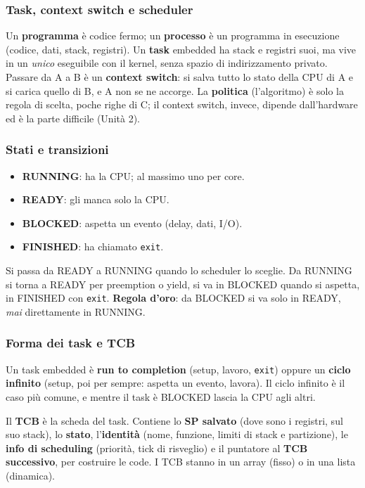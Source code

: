 \subsubsection*{Task, context switch e scheduler}
Un \textbf{programma} è codice fermo; un \textbf{processo} è un programma in esecuzione (codice, dati, stack, registri). Un \textbf{task} embedded ha stack e registri suoi, ma vive in un \emph{unico} eseguibile con il kernel, senza spazio di indirizzamento privato. Passare da A a B è un \textbf{context switch}: si salva tutto lo stato della CPU di A e si carica quello di B, e A non se ne accorge. La \textbf{politica} (l'algoritmo) è solo la regola di scelta, poche righe di C; il context switch, invece, dipende dall'hardware ed è la parte difficile (Unità 2).

\subsubsection*{Stati e transizioni}
\begin{itemize}
    \item \textbf{RUNNING}: ha la CPU; al massimo uno per core.
    \item \textbf{READY}: gli manca solo la CPU.
    \item \textbf{BLOCKED}: aspetta un evento (delay, dati, I/O).
    \item \textbf{FINISHED}: ha chiamato \texttt{exit}.
\end{itemize}
Si passa da READY a RUNNING quando lo scheduler lo sceglie. Da RUNNING si torna a READY per preemption o yield, si va in BLOCKED quando si aspetta, in FINISHED con \texttt{exit}. \textbf{Regola d'oro}: da BLOCKED si va solo in READY, \emph{mai} direttamente in RUNNING.

\subsubsection*{Forma dei task e TCB}
Un task embedded è \textbf{run to completion} (setup, lavoro, \texttt{exit}) oppure un \textbf{ciclo infinito} (setup, poi per sempre: aspetta un evento, lavora). Il ciclo infinito è il caso più comune, e mentre il task è BLOCKED lascia la CPU agli altri.

Il \textbf{TCB} è la scheda del task. Contiene lo \textbf{SP salvato} (dove sono i registri, sul suo stack), lo \textbf{stato}, l'\textbf{identità} (nome, funzione, limiti di stack e partizione), le \textbf{info di scheduling} (priorità, tick di risveglio) e il puntatore al \textbf{TCB successivo}, per costruire le code. I TCB stanno in un array (fisso) o in una lista (dinamica).

